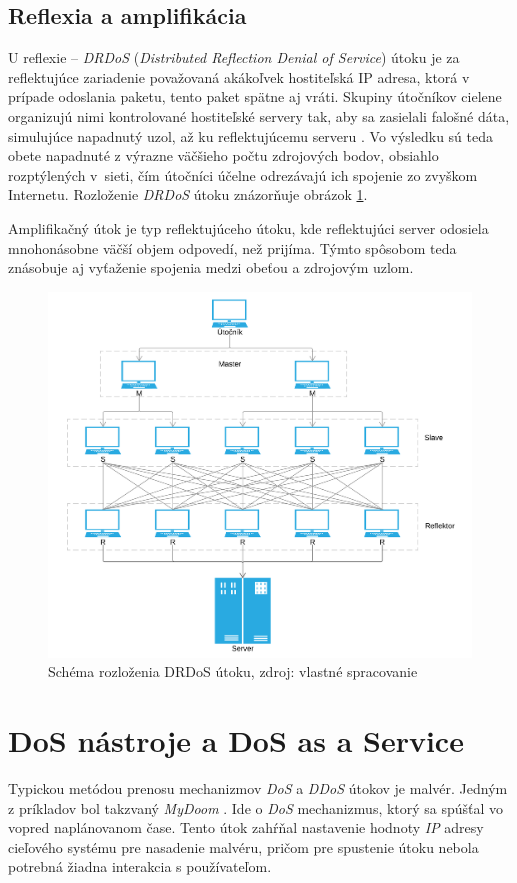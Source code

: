 \documentclass[
  printed, %
  table,   %
  lof,     %
  nolot,   %
  nocover
]{fithesis3}
\begin{document}
\subsection{Reflexia a amplifikácia}
U reflexie -- \textit{DRDoS} (\textit{Distributed Reflection Denial of Service})
útoku je za reflektujúce zariadenie považovaná akákoľvek hostiteľská IP adresa, 
ktorá v prípade odoslania
paketu, tento paket spätne aj vráti.
Skupiny útočníkov cielene organizujú nimi kontrolované hostiteľské servery tak, aby sa zasielali 
falošné dáta, simulujúce napadnutý uzol, až ku reflektujúcemu serveru \cite{Bukac:2015:DoS}. Vo výsledku sú teda obete 
napadnuté z výrazne väčšieho počtu zdrojových bodov, obsiahlo rozptýlených v~sieti, čím útočníci účelne 
odrezávajú ich spojenie zo zvyškom Internetu. Rozloženie \textit{DRDoS} útoku znázorňuje obrázok \ref{fig:drdos}.

Amplifikačný útok je typ reflektujúceho útoku, kde reflektujúci server odosiela mnohonásobne väčší 
objem odpovedí, než prijíma. Týmto spôsobom teda znásobuje aj vyťaženie spojenia medzi obeťou a 
zdrojovým uzlom\cite{Paxson:2001:DoSR}.

\begin{figure}[h]
  \centering
    \includegraphics[width=\textwidth]{images/drdos.png}
  \caption{Schéma rozloženia DRDoS útoku, zdroj: vlastné spracovanie}
  \label{fig:drdos}
\end{figure}

\section{DoS nástroje a DoS as a Service}
Typickou metódou prenosu mechanizmov \textit{DoS} a \textit{DDoS} útokov je malvér. Jedným z príkladov 
bol
takzvaný \textit{MyDoom} \cite{BBC:2004:DoST}. Ide o \textit{DoS} mechanizmus, ktorý sa spúšťal vo vopred naplánovanom čase.
Tento útok zahŕňal nastavenie hodnoty \textit{IP} adresy cieľového systému pre nasadenie malvéru,
pričom pre spustenie útoku nebola potrebná žiadna interakcia s používateľom.
\end{document}
